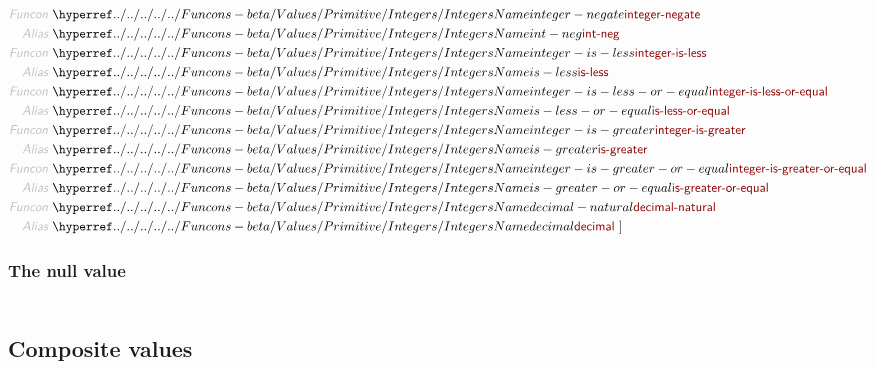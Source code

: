 \begin{align*}
  \KEY{Funcon} ~ & \NAMEHYPER{../../../../../Funcons-beta/Values/Primitive}{Integers}{integer-negate} \\
  \KEY{Alias} ~ & \NAMEHYPER{../../../../../Funcons-beta/Values/Primitive}{Integers}{int-neg} \\
  \KEY{Funcon} ~ & \NAMEHYPER{../../../../../Funcons-beta/Values/Primitive}{Integers}{integer-is-less} \\
  \KEY{Alias} ~ & \NAMEHYPER{../../../../../Funcons-beta/Values/Primitive}{Integers}{is-less} \\
  \KEY{Funcon} ~ & \NAMEHYPER{../../../../../Funcons-beta/Values/Primitive}{Integers}{integer-is-less-or-equal} \\
  \KEY{Alias} ~ & \NAMEHYPER{../../../../../Funcons-beta/Values/Primitive}{Integers}{is-less-or-equal} \\
  \KEY{Funcon} ~ & \NAMEHYPER{../../../../../Funcons-beta/Values/Primitive}{Integers}{integer-is-greater} \\
  \KEY{Alias} ~ & \NAMEHYPER{../../../../../Funcons-beta/Values/Primitive}{Integers}{is-greater} \\
  \KEY{Funcon} ~ & \NAMEHYPER{../../../../../Funcons-beta/Values/Primitive}{Integers}{integer-is-greater-or-equal} \\
  \KEY{Alias} ~ & \NAMEHYPER{../../../../../Funcons-beta/Values/Primitive}{Integers}{is-greater-or-equal} \\
  \KEY{Funcon} ~ & \NAMEHYPER{../../../../../Funcons-beta/Values/Primitive}{Integers}{decimal-natural} \\
  \KEY{Alias} ~ & \NAMEHYPER{../../../../../Funcons-beta/Values/Primitive}{Integers}{decimal}
  ~ ]
\end{align*}
\subsubsection*{The null value}\hypertarget{the-null-value}{}\label{the-null-value}

\begin{align*}
  [ ~ 
  \KEY{Datatype} ~ & \NAMEHYPER{../../../../../Funcons-beta/Values/Primitive}{Null}{null-type} \\
  \KEY{Funcon} ~ & \NAMEHYPER{../../../../../Funcons-beta/Values/Primitive}{Null}{null-value} \\
  \KEY{Alias} ~ & \NAMEHYPER{../../../../../Funcons-beta/Values/Primitive}{Null}{null}
  ~ ]
\end{align*}
\subsection*{Composite values}\hypertarget{composite-values}{}\label{composite-values}

